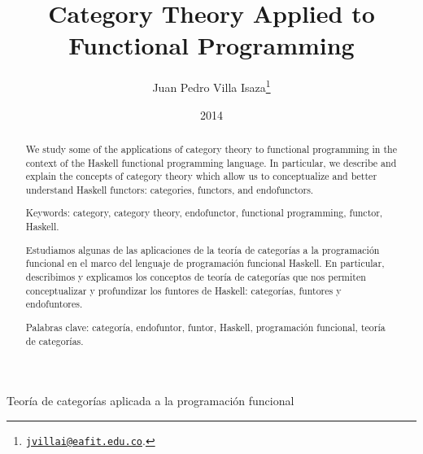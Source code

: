 \documentclass[11pt,letterpaper]{article}
\theoremstyle{definition}
\begin{document}
\title{Category Theory Applied to Functional Programming}

\author{Juan Pedro Villa Isaza\thanks{
    \href{mailto:jvillai@eafit.edu.co}{\nolinkurl{jvillai@eafit.edu.co}}.}}

\date{2014}

\maketitle

\begin{abstract}

  We study some of the applications of category theory to functional
  programming in the context of the Haskell functional programming
  language. In particular, we describe and explain the concepts of
  category theory which allow us to conceptualize and better
  understand Haskell functors: categories, functors, and endofunctors.

  \vspace{1em}
  \noindent
  Keywords: category, category theory, endofunctor, functional
  programming, functor, Haskell.

\end{abstract}

\begin{spanish}

  \begin{center}

    {\LARGE Teoría de categorías aplicada a la programación funcional}

  \end{center}

  \begin{abstract}

    Estudiamos algunas de las aplicaciones de la teoría de categorías
    a la programación funcional en el marco del lenguaje de
    programación funcional Haskell. En particular, describimos y
    explicamos los conceptos de teoría de categorías que nos permiten
    conceptualizar y profundizar los funtores de Haskell: categorías,
    funtores y endofuntores.

    \vspace{1em}
    \noindent
    Palabras clave: categoría, endofuntor, funtor, Haskell,
    programación funcional, teoría de categorías.

  \end{abstract}

\end{spanish}
\end{document}
